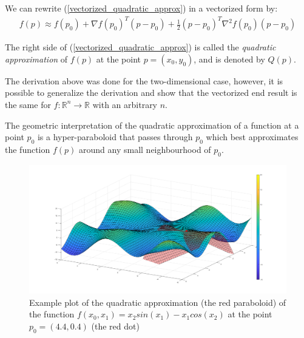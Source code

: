 We can rewrite (\ref{vectorized_quadratic_approx}) in a vectorized form by:
\begin{equation}\label{vectorized_quadratic_approx}
\begin{split}
f\left(p\right) \approx f\left(p_0\right) + \nabla f\left(p_0\right)^T\left(p-p_0\right) + \frac{1}{2}\left(p-p_0\right)^T\nabla^2 f\left(p_0\right)\left(p-p_0\right)
\end{split}
\end{equation}

\noindent The right side of (\ref{vectorized_quadratic_approx}) is called the \emph{quadratic approximation} of $f(p)$ at the point $p=(x_0, y_0)$, and is denoted by $Q(p)$.

\noindent The derivation above was done for the two-dimensional case, however, it is possible to generalize the derivation and show that the vectorized end result is the same for $f:\mathbb{R}^n\rightarrow\mathbb{R}$ with an arbitrary $n$.

\noindent The geometric interpretation of the quadratic approximation of a function at a point $p_0$ is a hyper-paraboloid that passes through $p_0$ which best approximates the function $f(p)$ around any small neighbourhood of $p_0$.

\begin{figure}[ht]
\centering
\includegraphics[width=13cm]{figures/quad_approx1}
\caption[Quadratic approximation example 1]{Example plot of the quadratic approximation (the red paraboloid) of the function $f\left(x_0, x_1\right) = x_2sin\left(x_1\right) - x_1cos\left(x_2\right)$ at the point $p_0 = \left(4.4, 0.4\right)$ (the red dot)}
\label{fig:quad_approx1}
\end{figure}

